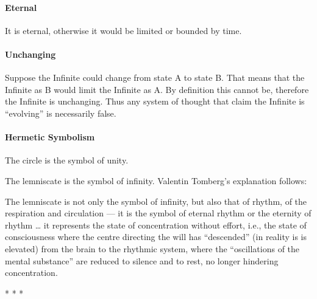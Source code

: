 \paragraph{Eternal}
It is eternal, otherwise it would be limited or bounded by time.

\paragraph{Unchanging}
Suppose the Infinite could change from state A to state B. That means that the Infinite as B would limit the Infinite as A. By definition this cannot be, therefore the Infinite is unchanging. Thus any system of thought that claim the Infinite is “evolving” is necessarily false.

\paragraph{Hermetic Symbolism}
The circle is the symbol of unity.

The lemniscate is the symbol of infinity. Valentin Tomberg's explanation follows:

\begin{quotex}
The lemniscate is not only the symbol of infinity, but also that of rhythm, of the respiration and circulation — it is the symbol of eternal rhythm or the eternity of rhythm … it represents the state of concentration without effort, i.e., the state of consciousness where the centre directing the will has “descended” (in reality is is elevated) from the brain to the rhythmic system, where the “oscillations of the mental substance” are reduced to silence and to rest, no longer hindering concentration. 

\end{quotex}

\hfill


\begin{center}* * *\end{center}

